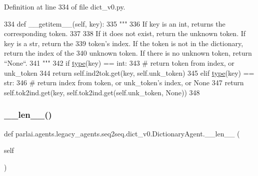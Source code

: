 Definition at line 334 of file dict\+\_\+v0.\+py.


\begin{DoxyCode}
334     \textcolor{keyword}{def }\_\_getitem\_\_(self, key):
335         \textcolor{stringliteral}{"""}
336 \textcolor{stringliteral}{        If key is an int, returns the corresponding token.}
337 \textcolor{stringliteral}{}
338 \textcolor{stringliteral}{        If it does not exist, return the unknown token. If key is a str, return the}
339 \textcolor{stringliteral}{        token's index. If the token is not in the dictionary, return the index of the}
340 \textcolor{stringliteral}{        unknown token. If there is no unknown token, return ``None``.}
341 \textcolor{stringliteral}{        """}
342         \textcolor{keywordflow}{if} \hyperlink{namespaceparlai_1_1agents_1_1tfidf__retriever_1_1build__tfidf_ad5dfae268e23f506da084a9efb72f619}{type}(key) == int:
343             \textcolor{comment}{# return token from index, or unk\_token}
344             \textcolor{keywordflow}{return} self.ind2tok.get(key, self.unk\_token)
345         \textcolor{keywordflow}{elif} \hyperlink{namespaceparlai_1_1agents_1_1tfidf__retriever_1_1build__tfidf_ad5dfae268e23f506da084a9efb72f619}{type}(key) == str:
346             \textcolor{comment}{# return index from token, or unk\_token's index, or None}
347             \textcolor{keywordflow}{return} self.tok2ind.get(key, self.tok2ind.get(self.unk\_token, \textcolor{keywordtype}{None}))
348 
\end{DoxyCode}
\mbox{\label{classparlai_1_1agents_1_1legacy__agents_1_1seq2seq_1_1dict__v0_1_1DictionaryAgent_a7cf7b736b38ff48f666e0b713328d568}} 
\subsubsection{\texorpdfstring{\+\_\+\+\_\+len\+\_\+\+\_\+()}{\_\_len\_\_()}}
{\footnotesize\ttfamily def parlai.\+agents.\+legacy\+\_\+agents.\+seq2seq.\+dict\+\_\+v0.\+Dictionary\+Agent.\+\_\+\+\_\+len\+\_\+\+\_\+ (\begin{DoxyParamCaption}\item[{}]{self }\end{DoxyParamCaption})}



